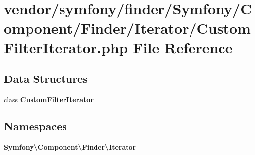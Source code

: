 \section{vendor/symfony/finder/\+Symfony/\+Component/\+Finder/\+Iterator/\+Custom\+Filter\+Iterator.php File Reference}
\label{_custom_filter_iterator_8php}
\subsection*{Data Structures}
\begin{DoxyCompactItemize}
\item 
class {\bf Custom\+Filter\+Iterator}
\end{DoxyCompactItemize}
\subsection*{Namespaces}
\begin{DoxyCompactItemize}
\item 
 {\bf Symfony\textbackslash{}\+Component\textbackslash{}\+Finder\textbackslash{}\+Iterator}
\end{DoxyCompactItemize}

